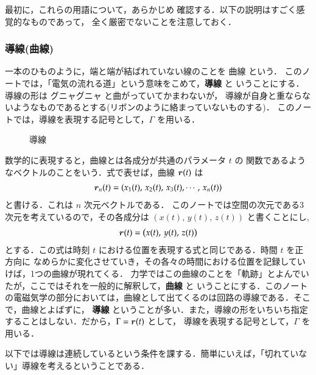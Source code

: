     最初に，これらの用語について，あらかじめ
    確認する．以下の説明はすごく感覚的なものであって，
    全く厳密でないことを注意しておく．

 \subsubsection{導線(曲線)}
    一本のひものように，端と端が結ばれていない線のことを 曲線 という．
    このノートでは，「電気の流れる道」という意味をこめて，\textbf{導線} と
    いうことにする．導線の形は グニャグニャ と曲がっていてかまわないが，
    導線が自身と重ならないようなものであるとする(リボンのように絡まっていないものする)．
    このノートでは，導線を表現する記号として，$\Gamma$ を用いる．
                \begin{figure}[hbt]
                    \begin{center}
                        \caption{導線}
                        \label{fig:kyokusenn}
                    \end{center}
                \end{figure}

    数学的に表現すると，曲線とは各成分が共通のパラメータ $t$ の
    関数であるようなベクトルのことをいう．式で表せば，曲線 $\boldsymbol{r}(t)$ は
        \begin{align}
            \boldsymbol{r}_{n}(t)=\left( x_{1}(t),\,x_{2}(t),\,x_{3}(t),\cdots ,\,x_{n}(t)\right)
        \end{align}
    と書ける．これは $n$ 次元ベクトルである．
    このノートでは空間の次元である3次元を考えているので，その各成分は $\left(x(t),\,y(t),\,z(t)\right)$ と書くことにし,
        \begin{align}
            \boldsymbol{r}(t)=\left( x(t),\,y(t),\,z(t)\right)
        \end{align}
    とする．この式は時刻 $t$ における位置を表現する式と同じである．時間 $t$ を正方向に
    なめらかに変化させていき，その各々の時間における位置を記録していけば，1つの曲線が現れてくる．
    力学ではこの曲線のことを「軌跡」とよんでいたが，ここではそれを一般的に解釈して，\textbf{曲線} と
    いうことにする．このノートの電磁気学の部分においては，曲線として出てくるのは回路の導線である．そこで，曲線とよばずに，
    \textbf{導線} ということが多い．また，導線の形をいちいち指定することはしない．だから，$\Gamma=\boldsymbol{r}(t)$ として，
    導線を表現する記号として，$\Gamma$ を用いる．

    以下では導線は連続しているという条件を課する．簡単にいえば，「切れていない」導線を考えるということである．


